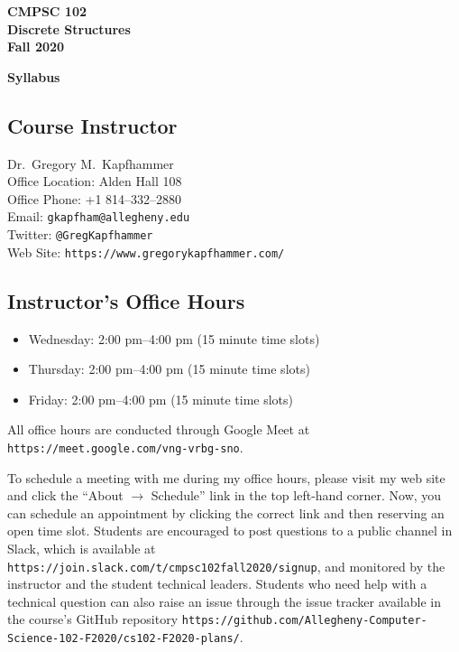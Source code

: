 \documentclass[11pt]{article}
\newcommand{\url}[1]{\lstinline{#1}}
\newcommand{\syllabustitle}[1]
{
  \begin{center}
    \begin{center}
      \bf
      CMPSC 102\\Discrete Structures\\
      Fall 2020\\
      \medskip
    \end{center}
    \bf
    #1
  \end{center}
}
\begin{document}
\thispagestyle{empty}

\syllabustitle{Syllabus}

\vspace*{-.175in}

\subsection*{Course Instructor}

Dr.\ Gregory M.\ Kapfhammer\\
\noindent Office Location: Alden Hall 108 \\
\noindent Office Phone: +1 814--332--2880 \\
\noindent Email: \url{gkapfham@allegheny.edu} \\
\noindent Twitter: \url{@GregKapfhammer} \\
\noindent Web Site: \url{https://www.gregorykapfhammer.com/}

\vspace*{-.115in}

\subsection*{Instructor's Office Hours}

\begin{itemize}

  \itemsep0em

  \item Wednesday: 2:00 pm--4:00 pm (15 minute time slots)

  \item Thursday: 2:00 pm--4:00 pm (15 minute time slots)

  \item Friday: 2:00 pm--4:00 pm (15 minute time slots)

\end{itemize}

\vspace*{-.075in}

\noindent All office hours are conducted through Google Meet at
\url{https://meet.google.com/vng-vrbg-sno}.

\noindent To schedule a meeting with me during my office hours, please visit my
web site and click the ``About $\rightarrow$ Schedule'' link in the top
left-hand corner. Now, you can schedule an appointment by clicking the correct
link and then reserving an open time slot. Students are encouraged to post
questions to a public channel in Slack, which is available at
\url{https://join.slack.com/t/cmpsc102fall2020/signup}, and monitored by the
instructor and the student technical leaders. Students who need help with a
technical question can also raise an issue through the issue tracker available
in the course's GitHub repository
\url{https://github.com/Allegheny-Computer-Science-102-F2020/cs102-F2020-plans/}.
\end{document}
